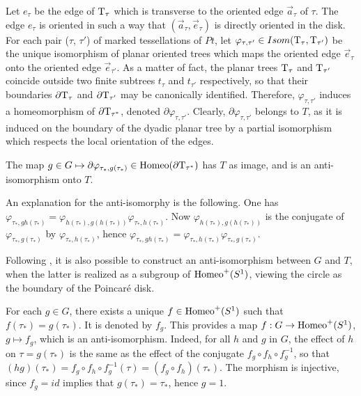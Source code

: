 \documentclass[twoside]{irmaems}
\theoremstyle{plain}
\theoremstyle{definition}
\theoremstyle{remark}
\begin{document}
\vspace{0.1cm}
\noindent 
Let $e_{\tau}$ be the edge of ${\rm T}_{\tau}$ which is transverse 
to the oriented edge 
 $\vec{a}_{\tau}$ of $\tau$. The edge $e_{\tau}$ is oriented in such a way that  
 $(\vec{a}_{\tau},\vec{e}_{\tau})$ is directly oriented in the disk. 
For each pair ($\tau$, $\tau'$) of marked tessellations of $Pt$, let
 $\varphi_{\tau,\tau'}\in Isom({\rm T}_{\tau},{\rm T}_{\tau'})$
be the unique isomorphism of planar oriented trees which maps the oriented edge  $\vec{e}_{\tau}$ onto 
the oriented edge $\vec{e}_{\tau'}$.  
As a matter of fact, the planar trees ${\rm T}_{\tau}$ and ${\rm T}_{\tau'}$  coincide outside two 
finite subtrees $t_{\tau}$ and $t_{\tau'}$ respectively, so that their boundaries  
$\partial {\rm T}_{\tau}$ and $\partial {\rm T}_{\tau'}$ may be canonically identified. Therefore,
$\varphi_{\tau,\tau'}$ induces a homeomorphism of $\partial {\rm T}_{\tau^*}$, 
denoted  $\partial \varphi_{\tau,\tau'}$. Clearly, $\partial \varphi_{\tau,\tau'}$ belongs to $T$, as it is induced on the boundary of the dyadic planar tree by a partial 
isomorphism which respects the local orientation of the edges.

\vspace{0.1cm}\noindent 
The map $g\in G\mapsto \partial\varphi_{\tau_{*}, g(\tau_{*})}\in {\rm Homeo} ( \partial {\rm T}_{\tau^*} )$ has $T$ as image, 
and is an anti-isomorphism onto  $T$.

\vspace{0.1cm}\noindent 
An explanation for the anti-isomorphy is the following. One has 
$\varphi_{\tau_{*}, gh(\tau_{*})}= \varphi_{h(\tau_{*}), g(h(\tau_{*}))}\varphi_{\tau_{*}, h(\tau_{*})}$. Now $\varphi_{h(\tau_{*}), g(h(\tau_{*}))}$ 
is the conjugate of 
$\varphi_{\tau_{*}, g(\tau_{*})}$ by $\varphi_{\tau_{*}, h(\tau_{*})}$, 
hence $\varphi_{\tau_{*}, gh(\tau_{*})}=
 \varphi_{\tau_{*}, h(\tau_{*})} \varphi_{\tau_{*}, g(\tau_{*})}$.

 \vspace{0.1cm}\noindent 
Following \cite{im}, it is also possible to construct an anti-isomorphism between $G$ and $T$, when the latter is realized as a subgroup of
  ${\rm Homeo}^+(S^1)$, viewing the circle as the boundary of the Poincar\'e disk.

\vspace{0.1cm}\noindent 
 For each $g\in G$, there exists a unique $f\in {\rm Homeo}^+(S^1)$ such that $f(\tau_{*})=g(\tau_{*})$. 
It is denoted by $f_{g}$. This provides a map  $f: G\rightarrow {\rm Homeo}^+(S^1)$, 
$g\mapsto f_{g}$, which is an anti-isomorphism. Indeed, for all $h$ and $g$ in $G$, the effect of
 $h$ on $\tau=g(\tau_{*})$ is the same as the effect of the conjugate 
 $f_{g}\circ f_{h}\circ f_{g}^{-1}$, so that
$(hg)(\tau_{*})=f_{g}\circ f_{h}\circ f_{g}^{-1}(\tau)=(f_{g}\circ f_{h})(\tau_{*})$. 
The morphism is injective, since $f_{g}=id$ implies that $g(\tau_{*})=\tau_{*}$, hence $g=1$.
\end{document}
